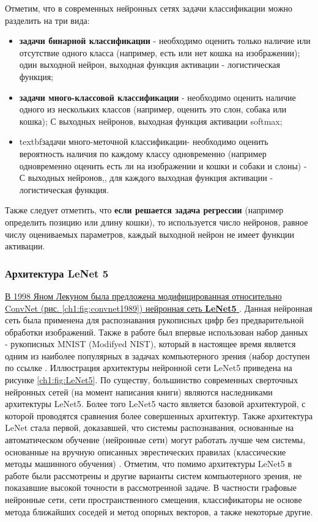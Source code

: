 \documentclass[12pt]{article}
\begin{document}
\begin{sloppypar}
Отметим, что в современных нейронных сетях задачи классификации можно разделить на три вида:
\begin{itemize}
    \item \textbf{задачи бинарной классификации} - необходимо оценить только наличие или отсутствие одного класса (например, есть или нет кошка на изображении); один выходной нейрон, выходная функция активации - логистическая функция;
    \item \textbf{задачи много-классовой классификации} - необходимо оценить наличие одного из нескольких классов (например, оценить это слон, собака или кошка); $С$ выходных нейронов, выходная функция активации softmax;
    \item textbf{задачи много-меточной классификации}-  необходимо оценить вероятность наличия по каждому  классу одновременно (например одновременно оценить есть ли на изображении и кошки и собаки и слоны) - $С$ выходных нейронов,, для каждого выходная функция активации - логистическая функция.
\end{itemize}    
Также следует отметить, что \textbf{если решается задача регрессии} (например определить позицию или длину кошки), то используется число нейронов, равное числу оцениваемых параметров, каждый выходной нейрон не имеет функции активации. 

\subsubsection{Архитектура LeNet 5} 
\uline{В 1998 Яном Лекуном была предложена модифицированная относительно  ConvNet (рис. \ref{ch1:fig:convnet1989}) нейронная сеть \textbf{LeNet5} \cite{lecun1998gradient}}. Данная нейронная сеть была применена для распознавания рукописных цифр без предварительной обработки изображений. 
Также в работе \cite{lecun1998gradient} был впервые использован набор данных  - рукописных MNIST (Modifyed NIST), который в настоящее время является одним из наиболее популярных в задачах компьютерного зрения (набор доступен по ссылке \cite{MNISTlecuncom}.
Иллюстрация архитектуры нейронной сети LeNet5 приведена на рисунке \ref{ch1:fig:LeNet5}. По существу, большинство современных сверточных нейронных сетей (на момент написания книги) являются наследниками архитектуры LeNet5. Более того LeNet5 часто является базовой архитектурой, с которой проводятся сравнения более совершенных архитектур. Также архитектура LeNet стала первой, доказавшей, что системы распознавания, основанные на автоматическом обучение (нейронные сети) могут работать лучше чем системы, основанные на вручную описанных эврестических правилах (классические методы машинного обучения) 
\cite{lecun1998gradient}. 
Отметим, что помимо архитектуры LeNet5 в работе \cite{lecun1998gradient} были рассмотрены и другие варианты систем компьютерного зрения, не показавшие высокой точности в рассмотренной задаче. В частности графовые нейронные сети, сети пространственного смещения, классификаторы не основе метода ближайших соседей и метод опорных векторов, а также некоторые другие.


\end{sloppypar}
\end{document}

